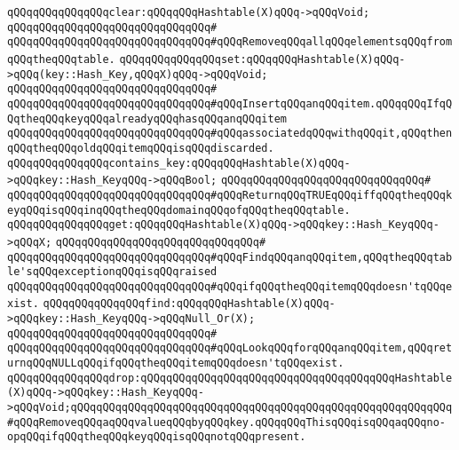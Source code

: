 \newline
\verb|qQQqqQQqqQQqqQQqclear:qQQqqQQqHashtable(X)qQQq->qQQqVoid;|\newline
\verb|qQQqqQQqqQQqqQQqqQQqqQQqqQQqqQQq#|\newline
\verb|qQQqqQQqqQQqqQQqqQQqqQQqqQQqqQQq#qQQqRemoveqQQqallqQQqelementsqQQqfromqQQqtheqQQqtable.|\newline
\newline
\verb|qQQqqQQqqQQqqQQqset:qQQqqQQqHashtable(X)qQQq->qQQq(key::Hash_Key,qQQqX)qQQq->qQQqVoid;|\newline
\verb|qQQqqQQqqQQqqQQqqQQqqQQqqQQqqQQq#|\newline
\verb|qQQqqQQqqQQqqQQqqQQqqQQqqQQqqQQq#qQQqInsertqQQqanqQQqitem.qQQqqQQqIfqQQqtheqQQqkeyqQQqalreadyqQQqhasqQQqanqQQqitem|\newline
\verb|qQQqqQQqqQQqqQQqqQQqqQQqqQQqqQQq#qQQqassociatedqQQqwithqQQqit,qQQqthenqQQqtheqQQqoldqQQqitemqQQqisqQQqdiscarded.|\newline
\newline
\verb|qQQqqQQqqQQqqQQqcontains_key:qQQqqQQqHashtable(X)qQQq->qQQqkey::Hash_KeyqQQq->qQQqBool;|\newline
\verb|qQQqqQQqqQQqqQQqqQQqqQQqqQQqqQQq#|\newline
\verb|qQQqqQQqqQQqqQQqqQQqqQQqqQQqqQQq#qQQqReturnqQQqTRUEqQQqiffqQQqtheqQQqkeyqQQqisqQQqinqQQqtheqQQqdomainqQQqofqQQqtheqQQqtable.|\newline
\newline
\verb|qQQqqQQqqQQqqQQqget:qQQqqQQqHashtable(X)qQQq->qQQqkey::Hash_KeyqQQq->qQQqX;|\newline
\verb|qQQqqQQqqQQqqQQqqQQqqQQqqQQqqQQq#|\newline
\verb|qQQqqQQqqQQqqQQqqQQqqQQqqQQqqQQq#qQQqFindqQQqanqQQqitem,qQQqtheqQQqtable'sqQQqexceptionqQQqisqQQqraised|\newline
\verb|qQQqqQQqqQQqqQQqqQQqqQQqqQQqqQQq#qQQqifqQQqtheqQQqitemqQQqdoesn'tqQQqexist.|\newline
\newline
\verb|qQQqqQQqqQQqqQQqfind:qQQqqQQqHashtable(X)qQQq->qQQqkey::Hash_KeyqQQq->qQQqNull_Or(X);|\newline
\verb|qQQqqQQqqQQqqQQqqQQqqQQqqQQqqQQq#|\newline
\verb|qQQqqQQqqQQqqQQqqQQqqQQqqQQqqQQq#qQQqLookqQQqforqQQqanqQQqitem,qQQqreturnqQQqNULLqQQqifqQQqtheqQQqitemqQQqdoesn'tqQQqexist.|\newline
\newline
\verb|qQQqqQQqqQQqqQQqdrop:qQQqqQQqqQQqqQQqqQQqqQQqqQQqqQQqqQQqqQQqHashtable(X)qQQq->qQQqkey::Hash_KeyqQQq->qQQqVoid;qQQqqQQqqQQqqQQqqQQqqQQqqQQqqQQqqQQqqQQqqQQqqQQqqQQqqQQqqQQq#qQQqRemoveqQQqaqQQqvalueqQQqbyqQQqkey.qQQqqQQqThisqQQqisqQQqaqQQqno-opqQQqifqQQqtheqQQqkeyqQQqisqQQqnotqQQqpresent.|\newline
